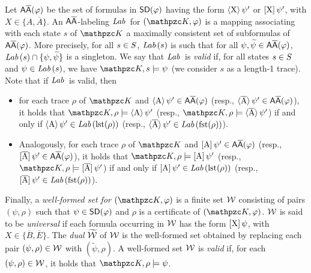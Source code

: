 Let $\mathsf{A\overline{A}}(\varphi)$ be the set of formulas in $\textsf{SD}(\varphi)$ having the form $\operatorname{\langle X\rangle}\psi'$ or $\operatorname{\mathopen[ X \mathclose]}\psi'$, with $X\in \{A,\overline{A}\}$.
An $\mathsf{A\overline{A}}$-labeling $\textit{Lab}\,$ for $(\Ku,\varphi)$ is a mapping associating with each state $s$ of $\Ku$ a maximally consistent set of subformulas of $\mathsf{A\overline{A}}(\varphi)$. More precisely, for all $s \in S$, $\textit{Lab}\,(s)$ is such that for all $\psi,\widetilde{\psi}\in \mathsf{A\overline{A}}(\varphi)$, $\textit{Lab}\,(s)\cap \{\psi,\widetilde{\psi}\}$ is a singleton.
 We say that $\textit{Lab}\,$ is \emph{valid} if, for all states $s \in S$ and $\psi\in \textit{Lab}\,(s)$, we have $\Ku,s\models \psi$ (we consider $s$ as a length-1 trace). 
Note that
if $\textit{Lab}\,$ is valid, then 
\begin{itemize}
    \item for each trace $\rho$ of $\Ku$ and $\operatorname{\langle A\rangle}\psi'\in \mathsf{A\overline{A}}(\varphi)$ (resp.,  $\operatorname{\langle \overline{A}\rangle}\psi'\in \mathsf{A\overline{A}}(\varphi)$), it holds that $\Ku,\rho\models \hsA\psi'$ (resp., $\Ku,\rho\models \hsAt\psi'$) if and only if $\operatorname{\langle A\rangle}\psi'\in \textit{Lab}\,(\operatorname{lst}(\rho))$ (resp., $\operatorname{\langle \overline{A}\rangle}\psi'\in \textit{Lab}\,(\operatorname{fst}(\rho))$). 
    \item Analogously, for each trace $\rho$ of $\Ku$ and $\operatorname{\mathopen[ A \mathclose]}\psi'\in \mathsf{A\overline{A}}(\varphi)$ (resp.,  $\operatorname{\mathopen[ \overline{A} \mathclose]}\psi'\in \mathsf{A\overline{A}}(\varphi)$), it holds that $\Ku,\rho\models \hsAu\psi'$ (resp., $\Ku,\rho\models \hsAtu\psi'$) if and only if $\operatorname{\mathopen[ A \mathclose]}\psi'\in \textit{Lab}\,(\operatorname{lst}(\rho))$ (resp., $\operatorname{\mathopen[ \overline{A} \mathclose]}\psi'\in \textit{Lab}\,(\operatorname{fst}(\rho))$).
\end{itemize}

Finally, a \emph{well-formed set for $(\Ku,\varphi)$} is a finite set ${\mathcal{W}}$ consisting of pairs $(\psi,\rho)$ such that $\psi\in\textsf{SD}(\varphi)$ and $\rho$ is a certificate of $(\Ku,\varphi)$.   
${\mathcal{W}}$ is said to be \emph{universal}
if each formula occurring in ${\mathcal{W}}$ has the form $\operatorname{\mathopen[ X \mathclose]}\psi$, with $X\in \{\overline{B},\overline{E}\}$.  The \emph{dual} $\widetilde{{\mathcal{W}}}$ of ${\mathcal{W}}$ is the well-formed set  obtained by replacing each pair $(\psi,\rho)\in {\mathcal{W}}$ with
   $(\widetilde{\psi},\rho)$.  A well-formed set ${\mathcal{W}}$ is \emph{valid} if, for each $(\psi,\rho)\in {\mathcal{W}}$, it holds that
  $\Ku,\rho\models \psi$.
 
\begin{algorithm}[tp]
\caption{$\texttt{check}(\Ku,\varphi)$ }\label{fig-proc-check}
\begin{algorithmic}[1]
%
         
    \EndCase
\EndFor
% 
\end{algorithmic}
\end{algorithm}

